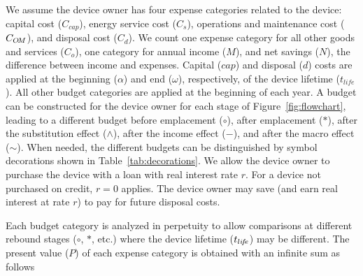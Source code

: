 
We assume the device owner has four expense categories 
related to the device:
capital cost ($C_{cap}$), 
energy service cost ($C_s$), 
operations and maintenance cost ($C_{O\!M}$), and
disposal cost ($C_d$).
We count one expense category for all other
goods and services ($C_o$),
one category for annual income ($M$), and 
net savings ($N$), 
the difference between income and expenses.
Capital ($cap$) and disposal ($d$) costs are applied
at the beginning ($\alpha$) and end ($\omega$), respectively, 
of the device lifetime ($t_{life}$).
All other budget categories are 
applied at the beginning of each year.
A budget can be constructed for the device owner for each stage
of Figure~\ref{fig:flowchart}, 
leading to a different budget 
before emplacement ($\circ$), 
after emplacement ($*$), 
after the substitution effect ($\wedge$), 
after the income effect ($-$), and 
after the macro effect ($\sim$).
When needed, 
the different budgets can be distinguished by symbol decorations
shown in Table~\ref{tab:decorations}.
We allow the device owner to purchase the device 
with a loan with real interest rate $r$.
For a device not purchased on credit,
$r = 0$ applies.
The device owner may save (and earn real interest at rate $r$)
to pay for future disposal costs.

Each budget category is analyzed in perpetuity
to allow comparisons at different rebound stages 
($\circ$, $*$, etc.)
where the device lifetime ($t_{li\!f\!e}$) may be different.
The present value ($P$) of each expense category is obtained
with an infinite sum as follows


